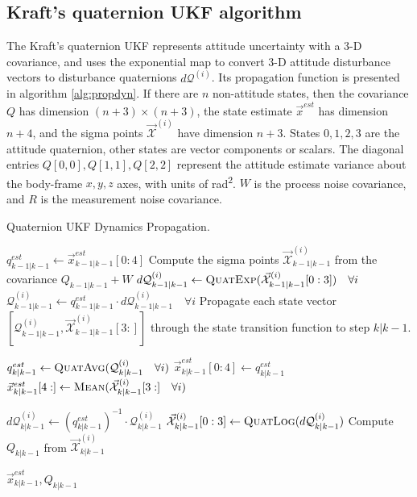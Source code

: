 \documentclass[conference]{IEEEtran}
\begin{document}
\subsection{Kraft's quaternion UKF algorithm}
The Kraft's quaternion UKF \cite{1257247} represents attitude uncertainty with a 3-D covariance, and uses the exponential map to convert 3-D attitude disturbance vectors to disturbance quaternions $d\mathcal{Q}^{(i)}$. Its propagation function is presented in algorithm \ref{alg:propdyn}. If there are $n$ non-attitude states, then the covariance $Q$ has dimension $(n+3) \times (n+3)$, the state estimate $\vec{x}^{est}$ has dimension $n+4$, and the sigma points $\vec{\mathcal{X}}^{(i)}$ have dimension $n+3$. States $0, 1, 2, 3$ are the attitude quaternion, other states are vector components or scalars. The diagonal entries $Q[0,0], Q[1,1], Q[2,2]$ represent the attitude estimate variance about the body-frame $x,y,z$ axes, with units of \si{\radian\squared}. $W$ is the process noise covariance, and $R$ is the measurement noise covariance.\\

\begin{algorithm}
  \caption{Quaternion UKF Dynamics Propagation.}
  \label{alg:propdyn}
  \begin{algorithmic}
      \State $q_{k-1|k-1}^{est} \gets \vec{x}_{k-1|k-1}^{est}[0:4]$
      \State Compute the sigma points $\vec{\mathcal{X}}^{(i)}_{k-1|k-1}$ from the covariance $Q_{k-1|k-1} + W$
      \State $d\mathcal{Q}^{(i)}_{k-1|k-1} \gets \textproc{QuatExp}(\vec{\mathcal{X}}^{(i)}_{k-1|k-1}[0:3]) \quad \forall i$
      \State $\mathcal{Q}^{(i)}_{k-1|k-1} \gets q_{k-1|k-1}^{est} \cdot d\mathcal{Q}^{(i)}_{k-1|k-1} \quad \forall i$
      \State Propagate each state vector $[\mathcal{Q}^{(i)}_{k-1|k-1}, \vec{\mathcal{X}}^{(i)}_{k-1|k-1}[3:]]$ through the state transition function to step $k|k-1$.

      \State $q_{k|k-1}^{est} \gets \textproc{QuatAvg}(\mathcal{Q}^{(i)}_{k|k-1} \quad \forall i)$
      \State $\vec{x}_{k|k-1}^{est}[0:4] \gets q_{k|k-1}^{est}$
      \State $\vec{x}_{k|k-1}^{est}[4:] \gets \textproc{Mean}(\vec{\mathcal{X}}^{(i)}_{k|k-1}[3:] \quad \forall i)$

      \State $d\mathcal{Q}^{(i)}_{k|k-1} \gets (q_{k|k-1}^{est})^{-1} \cdot \mathcal{Q}^{(i)}_{k|k-1}$
      \State $\vec{\mathcal{X}}^{(i)}_{k|k-1}[0:3] \gets \textproc{QuatLog}(d\mathcal{Q}^{(i)}_{k|k-1})$
      \State Compute $Q_{k|k-1}$ from $\vec{\mathcal{X}}^{(i)}_{k|k-1}$

      \Return $\vec{x}_{k|k-1}^{est}, Q_{k|k-1}$
      \EndFunction
  \end{algorithmic}
\end{algorithm}
\end{document}
